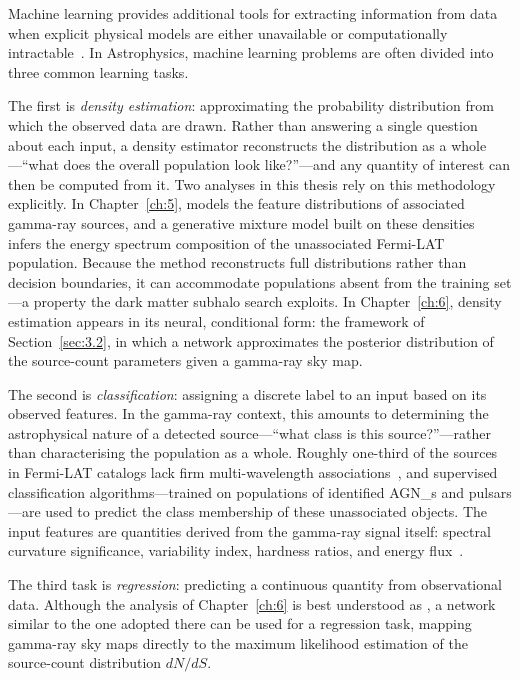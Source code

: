 Machine learning provides additional tools for extracting information from data when explicit physical models are either unavailable or computationally intractable~\cite{bishop,Hastie:2009}.
In Astrophysics, machine learning problems are often divided into three common learning tasks.

The first is \textit{density estimation}: approximating the probability distribution from which the observed data are drawn.
Rather than answering a single question about each input, a density estimator reconstructs the distribution as a whole---``what does the overall population look like?''---and any quantity of interest can then be computed from it.
Two analyses in this thesis rely on this methodology explicitly.
In Chapter~\ref{ch:5}, \KDE models the feature distributions of associated gamma-ray sources, and a generative mixture model built on these densities infers the energy spectrum composition of the unassociated Fermi-LAT population.
Because the method reconstructs full distributions rather than decision boundaries, it can accommodate populations absent from the training set---a property the dark matter subhalo search exploits.
In Chapter~\ref{ch:6}, density estimation appears in its neural, conditional form: the \NPE framework of Section~\ref{sec:3.2}, in which a network approximates the posterior distribution of the source-count parameters given a gamma-ray sky map.

The second is \textit{classification}: assigning a discrete label to an input based on its observed features.
In the gamma-ray context, this amounts to determining the astrophysical nature of a detected source---``what class is this source?''---rather than characterising the population as a whole.
Roughly one-third of the sources in Fermi-LAT catalogs lack firm multi-wavelength associations~\cite{Bhat:2022}, and supervised classification algorithms---trained on populations of identified \glspl{AGN_} and pulsars---are used to predict the class membership of these unassociated objects.
The input features are quantities derived from the gamma-ray signal itself: spectral curvature significance, variability index, hardness ratios, and energy flux~\cite{Bhat:2022}.

The third task is \textit{regression}: predicting a continuous quantity from observational data.
Although the analysis of Chapter~\ref{ch:6} is best understood as \NPE, a network similar to the one adopted there can be used for a regression task, mapping gamma-ray sky maps directly to the maximum likelihood estimation of the source-count distribution $dN/dS$.

